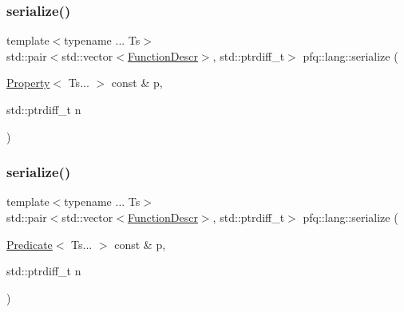 \subsubsection{\texorpdfstring{serialize()}{serialize()}\hspace{0.1cm}{\footnotesize\ttfamily [2/6]}}
{\footnotesize\ttfamily template$<$typename ... Ts$>$ \\
std\+::pair$<$std\+::vector$<$\hyperlink{structpfq_1_1lang_1_1FunctionDescr}{Function\+Descr}$>$, std\+::ptrdiff\+\_\+t$>$ pfq\+::lang\+::serialize (\begin{DoxyParamCaption}\item[{\hyperlink{structpfq_1_1lang_1_1Property}{Property}$<$ Ts... $>$ const \&}]{p,  }\item[{std\+::ptrdiff\+\_\+t}]{n }\end{DoxyParamCaption})\hspace{0.3cm}{\ttfamily [inline]}}

\mbox{\label{namespacepfq_1_1lang_ad631d8e32cf8613ad1f3f19f1b02cab6}} 
\subsubsection{\texorpdfstring{serialize()}{serialize()}\hspace{0.1cm}{\footnotesize\ttfamily [3/6]}}
{\footnotesize\ttfamily template$<$typename ... Ts$>$ \\
std\+::pair$<$std\+::vector$<$\hyperlink{structpfq_1_1lang_1_1FunctionDescr}{Function\+Descr}$>$, std\+::ptrdiff\+\_\+t$>$ pfq\+::lang\+::serialize (\begin{DoxyParamCaption}\item[{\hyperlink{structpfq_1_1lang_1_1Predicate}{Predicate}$<$ Ts... $>$ const \&}]{p,  }\item[{std\+::ptrdiff\+\_\+t}]{n }\end{DoxyParamCaption})\hspace{0.3cm}{\ttfamily [inline]}}

\mbox{\label{namespacepfq_1_1lang_a91564354df60bcd58020fbe47e1a7b2a}} 
